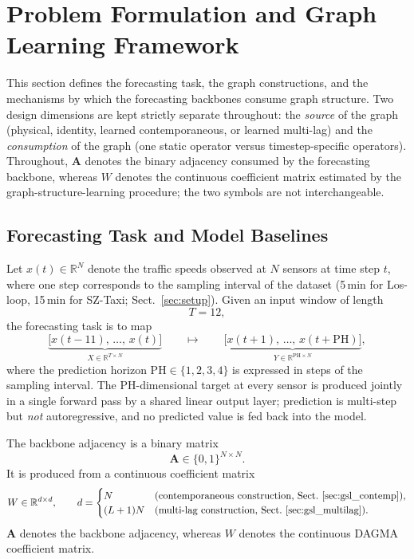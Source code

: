 \section{Problem Formulation and Graph Learning Framework}\label{sec:method}

This section defines the forecasting task, the graph constructions, and the
mechanisms by which the forecasting backbones consume graph structure. Two
design dimensions are kept strictly separate throughout: the \emph{source} of
the graph (physical, identity, learned contemporaneous, or learned multi-lag)
and the \emph{consumption} of the graph (one static operator versus
timestep-specific operators). Throughout, $\mathbf{A}$ denotes the binary
adjacency consumed by the forecasting backbone, whereas $W$ denotes the
continuous coefficient matrix estimated by the graph-structure-learning
procedure; the two symbols are not interchangeable.

\subsection{Forecasting Task and Model Baselines}\label{sec:task}

Let $x(t)\in\mathbb{R}^{N}$ denote the traffic speeds observed at $N$ sensors
at time step $t$, where one step corresponds to the sampling interval of the
dataset (5\,min for Los-loop, 15\,min for SZ-Taxi; Sect.~\ref{sec:setup}).
Given an input window of length
\[
T=12,
\]
the forecasting task is to map
\[
\underbrace{\bigl[x(t-11),\,\dots,\,x(t)\bigr]}_{\displaystyle X\in\mathbb{R}^{T\times N}}
\qquad\longmapsto\qquad
\underbrace{\bigl[x(t+1),\,\dots,\,x(t+\mathrm{PH})\bigr]}_{\displaystyle Y\in\mathbb{R}^{\mathrm{PH}\times N}},
\]
where the prediction horizon $\mathrm{PH}\in\{1,2,3,4\}$ is expressed in steps
of the sampling interval. The $\mathrm{PH}$-dimensional target at every sensor
is produced jointly in a single forward pass by a shared linear output layer;
prediction is multi-step but \emph{not} autoregressive, and no predicted value
is fed back into the model.

The backbone adjacency is a binary matrix
\[
\mathbf{A}\in\{0,1\}^{N\times N}.
\]
It is produced from a continuous coefficient matrix
\[
W\in\mathbb{R}^{d\times d},
\qquad
d=\begin{cases}
N & \text{(contemporaneous construction, Sect.~\ref{sec:gsl_contemp})},\\
(L+1)N & \text{(multi-lag construction, Sect.~\ref{sec:gsl_multilag})}.
\end{cases}
\]
$\mathbf{A}$ denotes the backbone adjacency, whereas $W$ denotes the continuous
DAGMA coefficient matrix.

